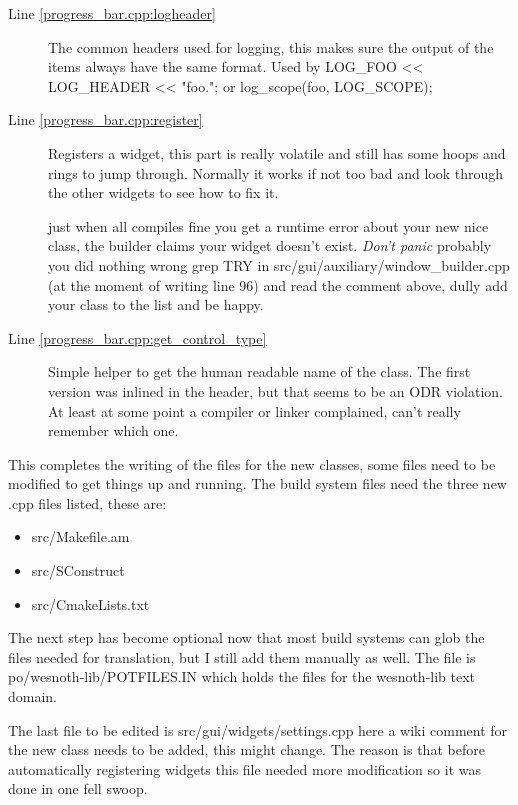 \documentclass[a4paper,notitlepage]{report}
\begin{document}
\begin{description}
\begin{description}
\begin{description}
	\item[Line \ref{progress_bar.cpp:logheader}]
		The common headers used for logging, this makes sure the output of the
		items always have the same format. Used by
		LOG\_FOO << LOG_HEADER << "foo.\n"; or
		log\_scope(foo, LOG_SCOPE); %

	\item[Line \ref{progress_bar.cpp:register}]
		Registers a widget, this part is really volatile and still has some
		hoops and rings to jump through. Normally it works if not too bad and
		look through the other widgets to see how to fix it. 

		 just when all compiles fine you get a runtime
		error about your new nice class, the builder claims your widget doesn't
		exist. \emph{Don't panic} probably you did nothing wrong grep TRY in
		src/gui/auxiliary/window\_builder.cpp (at the moment of writing line 96)
		and read the comment above, dully add your class to the list and be
		happy.

	\item[Line \ref{progress_bar.cpp:get_control_type}]
		Simple helper to get the human readable name of the class. The first
		version was inlined in the header, but that seems to be an ODR
		violation. At least at some point a compiler or linker complained, can't
		really remember which one. %

	\end{description}
\end{description}

This completes the writing of the files for the new classes, some files need to
be modified to get things up and running. The build system files need the three
new .cpp files listed, these are:
\begin{itemize}
\item src/Makefile.am
\item src/SConstruct
\item src/CmakeLists.txt
\end{itemize}

The next step has become optional now that most build systems can glob the files
needed for translation, but I still add them manually as well. The file is 
po/wesnoth-lib/POTFILES.IN which holds the files for the wesnoth-lib text
domain.

The last file to be edited is src/gui/widgets/settings.cpp here a wiki comment
for the new class needs to be added, this might change. The reason is that
before automatically registering widgets this file needed more modification so
it was done in one fell swoop.

\end{description}
\end{document}

